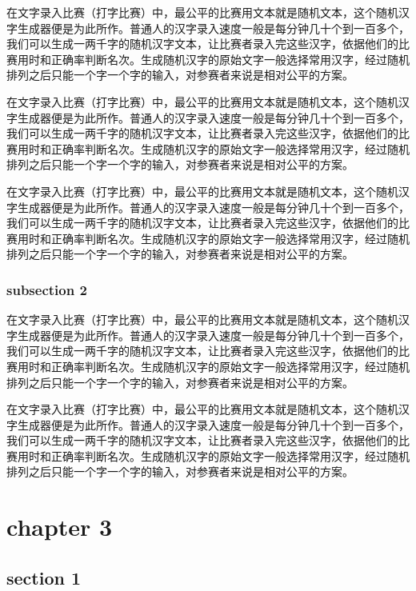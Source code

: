 \documentclass[12pt,hyperref,UTF8]{ctexbook}
\begin{document}
在文字录入比赛（打字比赛）中，最公平的比赛用文本就是随机文本，这个随机汉字生成器便是为此所作。普通人的汉字录入速度一般是每分钟几十个到一百多个，我们可以生成一两千字的随机汉字文本，让比赛者录入完这些汉字，依据他们的比赛用时和正确率判断名次。生成随机汉字的原始文字一般选择常用汉字，经过随机排列之后只能一个字一个字的输入，对参赛者来说是相对公平的方案。

在文字录入比赛（打字比赛）中，最公平的比赛用文本就是随机文本，这个随机汉字生成器便是为此所作。普通人的汉字录入速度一般是每分钟几十个到一百多个，我们可以生成一两千字的随机汉字文本，让比赛者录入完这些汉字，依据他们的比赛用时和正确率判断名次。生成随机汉字的原始文字一般选择常用汉字，经过随机排列之后只能一个字一个字的输入，对参赛者来说是相对公平的方案。

在文字录入比赛（打字比赛）中，最公平的比赛用文本就是随机文本，这个随机汉字生成器便是为此所作。普通人的汉字录入速度一般是每分钟几十个到一百多个，我们可以生成一两千字的随机汉字文本，让比赛者录入完这些汉字，依据他们的比赛用时和正确率判断名次。生成随机汉字的原始文字一般选择常用汉字，经过随机排列之后只能一个字一个字的输入，对参赛者来说是相对公平的方案。

\subsection{subsection 2}

在文字录入比赛（打字比赛）中，最公平的比赛用文本就是随机文本，这个随机汉字生成器便是为此所作。普通人的汉字录入速度一般是每分钟几十个到一百多个，我们可以生成一两千字的随机汉字文本，让比赛者录入完这些汉字，依据他们的比赛用时和正确率判断名次。生成随机汉字的原始文字一般选择常用汉字，经过随机排列之后只能一个字一个字的输入，对参赛者来说是相对公平的方案。

在文字录入比赛（打字比赛）中，最公平的比赛用文本就是随机文本，这个随机汉字生成器便是为此所作。普通人的汉字录入速度一般是每分钟几十个到一百多个，我们可以生成一两千字的随机汉字文本，让比赛者录入完这些汉字，依据他们的比赛用时和正确率判断名次。生成随机汉字的原始文字一般选择常用汉字，经过随机排列之后只能一个字一个字的输入，对参赛者来说是相对公平的方案。

\cleardoublepage
\chapter{chapter 3}

\section{section 1}
\end{document}
